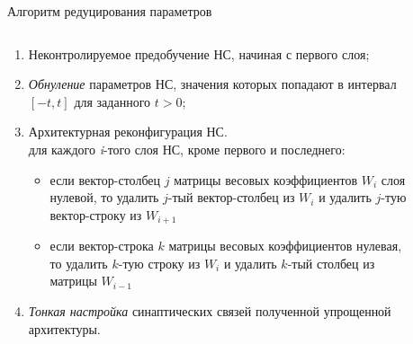 \documentclass[10pt]{beamer}
\begin{document}
        \begin{frame}{Алгоритм редуцирования параметров}
        \begin{columns}
            \begin{column}{0.6\textwidth}
            \begin{enumerate}
                \item Неконтролируемое предобучение НС, начиная с первого слоя;
                \item \textit{Обнуление} параметров НС, значения которых попадают в интервал $[-t, t]$ для заданного $t>0$;
                \item Архитектурная реконфигурация НС.\\
                    для каждого \textit{i}-того слоя НС, кроме первого и последнего:
                    \begin{itemize}
                        \item если вектор-столбец $j$ матрицы весовых коэффициентов $W_i$ слоя нулевой, то удалить $j$-тый вектор-столбец из $W_i$ и удалить $j$-тую вектор-строку из $W_{i+1}$
                        \item если вектор-строка $k$ матрицы весовых коэффициентов нулевая, то удалить $k$-тую строку из $W_i$ и удалить $k$-тый столбец из матрицы $W_{i-1}$
                    \end{itemize}
                \item \textit{Тонкая настройка} синаптических связей полученной упрощенной архитектуры.
            \end{enumerate}
            \end{column}
            \begin{column}{0.4\textwidth}
                \begin{figure}[H]
                    \centering

\end{figure}
\end{column}
\end{columns}
\end{frame}
\end{document}
